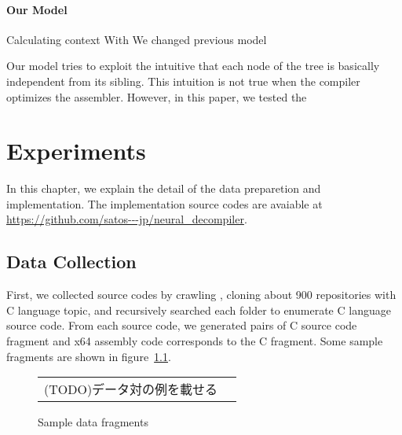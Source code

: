 \documentclass[senior,final,11pt]{iscs-thesis}
\begin{document}
\subsubsection{Our Model}

Calculating context With 
We changed previous model 

Our model tries to exploit the intuitive that each node of the tree is basically independent from its sibling.
This intuition is not true when the compiler optimizes the assembler. 
However, in this paper, we tested the 









\chapter{Experiments}
In this chapter, we explain the detail of the data preparetion and implementation.
The implementation source codes are avaiable at \url{https://github.com/satos---jp/neural_decompiler}.  

\section{Data Collection}
First, we collected source codes by crawling \cite[GitHub]{github}, cloning about 900 repositories with C language topic, 
and recursively searched each folder to enumerate C language source code.
From each source code, we generated pairs of C source code fragment and x64 assembly code corresponds to the C fragment.
Some sample fragments are shown in figure~\ref{fig:pairsoffragments}. 

\begin{figure}
	\begin{tabular}{cc}
		(TODO)データ対の例を載せる
	\end{tabular}
	\caption{Sample data fragments}
	\label{fig:pairsoffragments}
\end{figure}
\end{document}

